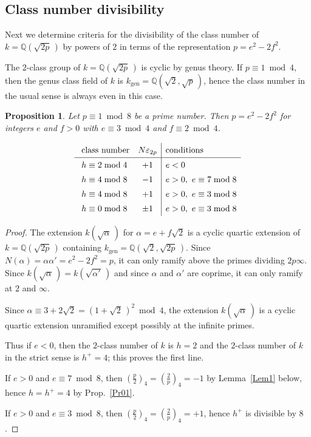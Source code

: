 \documentclass{amsart}
\newcommand{\rsp}{\raisebox{0em}[2.7ex][1.3ex]{\rule{0em}{2ex} }}
\newtheorem{prop}[lem]{Proposition}
\newcommand{\Q}{{\mathbb Q}}
\newcommand{\gen}{{\operatorname{gen}}}
\newcommand{\eps}{\varepsilon}
\begin{document}
\subsection*{Class number divisibility}

Next we determine criteria for the divisibility of the class number of
$k = \Q(\sqrt{2p}\,)$ by powers of $2$ in terms of the representation
$p = e^2 - 2f^2$.

The $2$-class group of $k = \Q(\sqrt{2p}\,)$ is cyclic by genus theory.
If $p \equiv 1 \bmod 4$, then the genus class field of $k$ is
$k_\gen = \Q(\sqrt{2}, \sqrt{p}\,)$, hence the class number in the
usual sense is always even in this case.

\begin{prop}
  Let $p \equiv 1 \bmod 8$ be a prime number. Then $p = e^2 - 2f^2$
  for integers $e$ and $f > 0$ with $e \equiv 3 \bmod 4$ and
  $f \equiv 2 \bmod 4$.

  $$ \begin{array}{lc|l}
    \rsp \text{class number} &  N\eps_{2p} & \text{conditions} \\ \hline
    \rsp  h \equiv 2 \bmod 4 & +1    & e < 0 \\
    \rsp  h \equiv 4 \bmod 8 & -1    & e > 0, \ e \equiv 7 \bmod 8 \\
    \rsp  h \equiv 4 \bmod 8 & +1    & e > 0, \ e \equiv 3 \bmod 8 \\
    \rsp  h \equiv 0 \bmod 8 & \pm 1 & e > 0, \ e \equiv 3 \bmod 8
  \end{array} $$
\end{prop}

\begin{proof}
  The extension $k(\sqrt{\alpha}\,)$ for $\alpha = e + f\sqrt{2}$
  is a cyclic quartic extension of $k = \Q(\sqrt{2p}\,)$ containing
  $k_\gen = \Q(\sqrt{2},\sqrt{2p}\,)$. Since
  $N(\alpha) = \alpha\alpha' = e^2 - 2f^2 = p$, it can only ramify above
  the primes dividing $2 p \infty$. Since
  $k(\sqrt{\alpha}\,) = k(\sqrt{\alpha'}\,)$ and since $\alpha$ and $\alpha'$
  are coprime,  it can only ramify at $2$ and $\infty$.

  Since $\alpha \equiv 3+2\sqrt{2} = (1+\sqrt{2}\,)^2 \bmod 4$, the
  extension $k(\sqrt{\alpha}\,)$ is a cyclic quartic extension
  unramified except possibly at the infinite primes.

  Thus if $e < 0$, then the $2$-class number of $k$ is $h = 2$ and the
  $2$-class number of $k$ in the strict sense is $h^+ = 4$; this proves the
  first line.

  If $e > 0$ and $e \equiv 7 \bmod 8$, then $(\frac p2)_4 = (\frac2p)_4 = -1$
  by Lemma~\ref{Lem1} below, hence $h = h^+ = 4$ by Prop.~\ref{Pr01}.

  If $e > 0$ and $e \equiv 3 \bmod 8$, then $(\frac p2)_4 = (\frac2p)_4 = +1$,
  hence $h^+$ is divisible by $8$. 
\end{proof}
\end{document}
